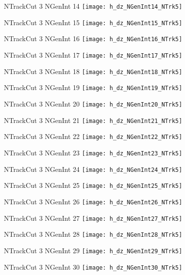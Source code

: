 \documentclass[8pt]{beamer}
\begin{document}
\begin{frame}
\center
\large{NTrackCut 3 NGenInt 14}
\texttt{[image: h\_dz\_NGenInt14\_NTrk5]}
\end{frame}
\begin{frame}
\center
\large{NTrackCut 3 NGenInt 15}
\texttt{[image: h\_dz\_NGenInt15\_NTrk5]}
\end{frame}
\begin{frame}
\center
\large{NTrackCut 3 NGenInt 16}
\texttt{[image: h\_dz\_NGenInt16\_NTrk5]}
\end{frame}
\begin{frame}
\center
\large{NTrackCut 3 NGenInt 17}
\texttt{[image: h\_dz\_NGenInt17\_NTrk5]}
\end{frame}
\begin{frame}
\center
\large{NTrackCut 3 NGenInt 18}
\texttt{[image: h\_dz\_NGenInt18\_NTrk5]}
\end{frame}
\begin{frame}
\center
\large{NTrackCut 3 NGenInt 19}
\texttt{[image: h\_dz\_NGenInt19\_NTrk5]}
\end{frame}
\begin{frame}
\center
\large{NTrackCut 3 NGenInt 20}
\texttt{[image: h\_dz\_NGenInt20\_NTrk5]}
\end{frame}
\begin{frame}
\center
\large{NTrackCut 3 NGenInt 21}
\texttt{[image: h\_dz\_NGenInt21\_NTrk5]}
\end{frame}
\begin{frame}
\center
\large{NTrackCut 3 NGenInt 22}
\texttt{[image: h\_dz\_NGenInt22\_NTrk5]}
\end{frame}
\begin{frame}
\center
\large{NTrackCut 3 NGenInt 23}
\texttt{[image: h\_dz\_NGenInt23\_NTrk5]}
\end{frame}
\begin{frame}
\center
\large{NTrackCut 3 NGenInt 24}
\texttt{[image: h\_dz\_NGenInt24\_NTrk5]}
\end{frame}
\begin{frame}
\center
\large{NTrackCut 3 NGenInt 25}
\texttt{[image: h\_dz\_NGenInt25\_NTrk5]}
\end{frame}
\begin{frame}
\center
\large{NTrackCut 3 NGenInt 26}
\texttt{[image: h\_dz\_NGenInt26\_NTrk5]}
\end{frame}
\begin{frame}
\center
\large{NTrackCut 3 NGenInt 27}
\texttt{[image: h\_dz\_NGenInt27\_NTrk5]}
\end{frame}
\begin{frame}
\center
\large{NTrackCut 3 NGenInt 28}
\texttt{[image: h\_dz\_NGenInt28\_NTrk5]}
\end{frame}
\begin{frame}
\center
\large{NTrackCut 3 NGenInt 29}
\texttt{[image: h\_dz\_NGenInt29\_NTrk5]}
\end{frame}
\begin{frame}
\center
\large{NTrackCut 3 NGenInt 30}
\texttt{[image: h\_dz\_NGenInt30\_NTrk5]}
\end{frame}
\end{document}
